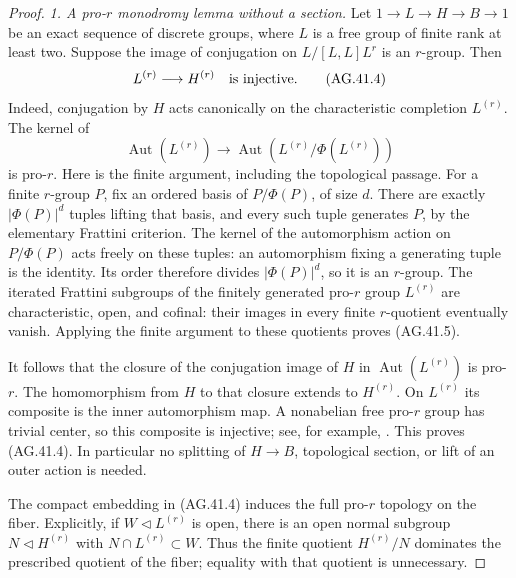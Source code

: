 \begin{proof}
\emph{1. A pro-\(r\) monodromy lemma without a section.}
Let \(1\to L\to H\to B\to1\) be an exact sequence of
discrete groups, where \(L\) is a free group of finite rank
at least two. Suppose the image of conjugation on
\(L/[L,L]L^r\) is an \(r\)-group. Then
\[
                         L^{(r)}\longrightarrow H^{(r)}
                    \quad\hbox{is injective}.             \tag{AG.41.4}
\]
Indeed, conjugation by \(H\) acts canonically on the
characteristic completion \(L^{(r)}\). The kernel of
\[
 \operatorname{Aut}(L^{(r)})\longrightarrow
 \operatorname{Aut}(L^{(r)}/\Phi(L^{(r)}))
                                                        \tag{AG.41.5}
\]
is pro-\(r\). Here is the finite argument, including the
topological passage. For a finite \(r\)-group \(P\), fix
an ordered basis of \(P/\Phi(P)\), of size \(d\).
There are exactly \(|\Phi(P)|^d\) tuples lifting that basis,
and every such tuple generates \(P\), by the elementary
Frattini criterion. The kernel of the automorphism action
on \(P/\Phi(P)\) acts freely on these tuples: an
automorphism fixing a generating tuple is the identity.
Its order therefore divides \(|\Phi(P)|^d\), so it is an
\(r\)-group. The iterated Frattini subgroups of the
finitely generated pro-\(r\) group \(L^{(r)}\) are
characteristic, open, and cofinal: their images in every
finite \(r\)-quotient eventually vanish. Applying the
finite argument to these quotients proves (AG.41.5).

It follows that the closure of the conjugation image of
\(H\) in \(\operatorname{Aut}(L^{(r)})\) is pro-\(r\).
The homomorphism from \(H\) to that closure extends to
\(H^{(r)}\). On \(L^{(r)}\) its composite is the inner
automorphism map. A nonabelian free pro-\(r\) group has
trivial center, so this composite is injective; see, for
example, \cite[Theorem~5.1, proof Case~I, and
Corollary~5.3]{FF_KochloukovaZalesskii2011}.
This proves (AG.41.4). In particular no splitting of
\(H\to B\), topological section, or lift of an outer
action is needed.

The compact embedding in (AG.41.4) induces the full
pro-\(r\) topology on the fiber. Explicitly, if
\(W\triangleleft L^{(r)}\) is open, there is an open
normal subgroup \(N\triangleleft H^{(r)}\) with
\(N\cap L^{(r)}\subset W\). Thus the finite quotient
\(H^{(r)}/N\) dominates the prescribed quotient of the
fiber; equality with that quotient is unnecessary.


\end{proof}
